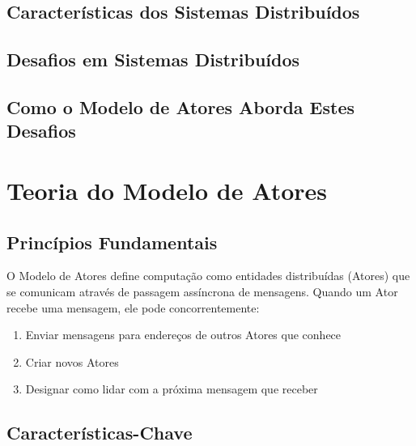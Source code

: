\subsection{Características dos Sistemas Distribuídos}


\subsection{Desafios em Sistemas Distribuídos}


\subsection{Como o Modelo de Atores Aborda Estes Desafios}


\section{Teoria do Modelo de Atores}


\subsection{Princípios Fundamentais}

O Modelo de Atores define computação como entidades distribuídas (Atores) que se comunicam através de passagem assíncrona de mensagens. Quando um Ator recebe uma mensagem, ele pode concorrentemente:

\begin{enumerate}
    \item Enviar mensagens para endereços de outros Atores que conhece
    \item Criar novos Atores
    \item Designar como lidar com a próxima mensagem que receber
\end{enumerate}

\subsection{Características-Chave}

